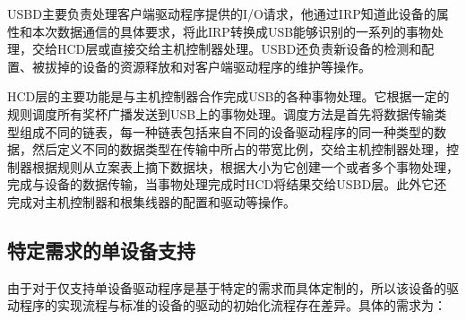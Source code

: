 	USBD主要负责处理客户端驱动程序提供的I/O请求，他通过IRP知道此设备的属性和本次数据通信的具体要求，将此IRP转换成USB能够识别的一系列的事物处理，交给HCD层或直接交给主机控制器处理。USBD还负责新设备的检测和配置、被拔掉的设备的资源释放和对客户端驱动程序的维护等操作。
	
	HCD层的主要功能是与主机控制器合作完成USB的各种事物处理。它根据一定的规则调度所有奖杯广播发送到USB上的事物处理。调度方法是首先将数据传输类型组成不同的链表，每一种链表包括来自不同的设备驱动程序的同一种类型的数据，然后定义不同的数据类型在传输中所占的带宽比例，交给主机控制器处理，控制器根据规则从立案表上摘下数据块，根据大小为它创建一个或者多个事物处理，完成与设备的数据传输，当事物处理完成时HCD将结果交给USBD层。此外它还完成对主机控制器和根集线器的配置和驱动等操作。


\subsection{特定需求的单设备支持}

	由于对于仅支持单设备驱动程序是基于特定的需求而具体定制的，所以该设备的驱动程序的实现流程与标准的设备的驱动的初始化流程存在差异。具体的需求为：

